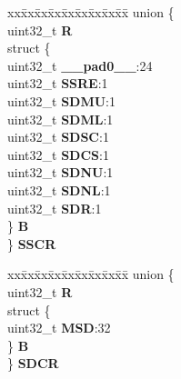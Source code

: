 \begin{DoxyCompactItemize}
\begin{tabbing}
\end{tabbing}\item 
\mbox{\label{structMLB__tag_a3b44c38e716f8fcd02e1b67100c7aa2a}} 
\begin{tabbing}
xx\=xx\=xx\=xx\=xx\=xx\=xx\=xx\=xx\=\kill
union \{\\
\>uint32\_t {\bfseries R}\\
\>struct \{\\
\>\>uint32\_t {\bfseries \_\_pad0\_\_}:24\\
\>\>uint32\_t {\bfseries SSRE}:1\\
\>\>uint32\_t {\bfseries SDMU}:1\\
\>\>uint32\_t {\bfseries SDML}:1\\
\>\>uint32\_t {\bfseries SDSC}:1\\
\>\>uint32\_t {\bfseries SDCS}:1\\
\>\>uint32\_t {\bfseries SDNU}:1\\
\>\>uint32\_t {\bfseries SDNL}:1\\
\>\>uint32\_t {\bfseries SDR}:1\\
\>\} {\bfseries B}\\
\} {\bfseries SSCR}\\

\end{tabbing}\item 
\mbox{\label{structMLB__tag_aa01213650e2b72fdd7b5d4e872f5c1f5}} 
\begin{tabbing}
xx\=xx\=xx\=xx\=xx\=xx\=xx\=xx\=xx\=\kill
union \{\\
\>uint32\_t {\bfseries R}\\
\>struct \{\\
\>\>uint32\_t {\bfseries MSD}:32\\
\>\} {\bfseries B}\\
\} {\bfseries SDCR}\\


\end{tabbing}
\end{DoxyCompactItemize}
